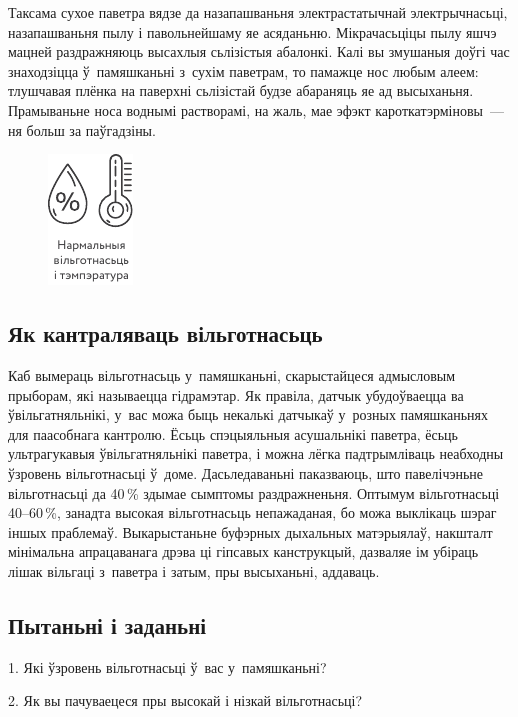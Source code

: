 Таксама сухое паветра вядзе да назапашваньня электрастатычнай электрычнасьці, назапашваньня пылу і павольнейшаму яе асяданьню. Мікрачасьціцы пылу яшчэ мацней раздражняюць высахлыя сьлізістыя абалонкі. Калі вы змушаныя доўгі час знаходзіцца ў~памяшканьні з~сухім паветрам, то памажце нос любым алеем: тлушчавая плёнка на паверхні сьлізістай будзе абараняць яе ад высыханьня. Прамываньне носа воднымі растворамі, на жаль, мае эфэкт кароткатэрміновы~--- ня больш за паўгадзіны.

\begin{figure}[htb!]
  \centering
  \includegraphics[scale=1.5]{willpower/ch11/12.pdf}
\end{figure}

\subsection*{Як кантраляваць вільготнасьць}

Каб вымераць вільготнасьць у~памяшканьні, скарыстайцеся адмысловым прыборам, які называецца гідрамэтар. Як правіла, датчык убудоўваецца ва ўвільгатняльнікі, у~вас можа быць некалькі датчыкаў у~розных памяшканьнях для паасобнага кантролю. Ёсьць спэцыяльныя асушальнікі паветра, ёсьць ультрагукавыя ўвільгатняльнікі паветра, і можна лёгка падтрымліваць неабходны ўзровень вільготнасьці ў~доме. Дасьледаваньні паказваюць, што павелічэньне вільготнасьці да 40\,\% здымае сымптомы раздражненьня. Оптымум вільготнасьці 40--60\,\%, занадта высокая вільготнасьць непажаданая, бо можа выклікаць шэраг іншых праблемаў. Выкарыстаньне буфэрных дыхальных матэрыялаў, накшталт мінімальна апрацаванага дрэва ці гіпсавых канструкцый, дазваляе ім убіраць лішак вільгаці з~паветра і затым, пры высыханьні, аддаваць.

\subsection*{Пытаньні і заданьні}

1. Які ўзровень вільготнасьці ў~вас у~памяшканьні?

2. Як вы пачуваецеся пры высокай і нізкай вільготнасьці?

